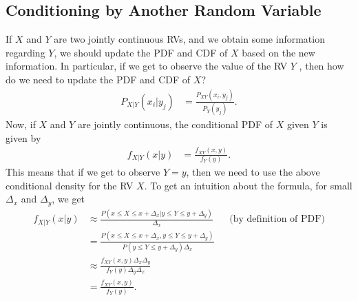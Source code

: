 \subsection{Conditioning by Another Random Variable}

If $X$ and $Y$ are two jointly continuous RVs, and we obtain some information regarding $Y$, we should update the PDF and CDF of $X$ based on the new information. In particular, if we get to observe the value of the RV $Y$ , then how do we need to update the PDF and CDF of $X$?
\begin{align*}
	P_{X|Y}(x_i|y_j)&= \frac{P_{XY}(x_i,y_j)}{P_Y(y_j)}.
\end{align*}
Now, if $X$ and $Y$ are jointly continuous, the conditional PDF of $X$ given $Y$ is given by
\begin{align*}
	f_{X|Y}(x|y)&= \frac{f_{XY}(x,y)}{f_Y(y)}.
\end{align*}
This means that if we get to observe $Y=y$, then we need to use the above conditional density for the RV $X$. To get an intuition about the formula, for small $\Delta_x$ and $\Delta_y$, we get
\begin{align*}
	 f_{X|Y}(x|y) &\approx \frac{P(x \leq X \leq x+\Delta_x | y \leq Y \leq y+\Delta_y)}{\Delta_x} \hspace{20pt} \textrm{(by definition of PDF)}\\
	 &=\frac{P(x \leq X \leq x+\Delta_x , y \leq Y \leq y+\Delta_y)}{P(y \leq Y \leq y+\Delta_y) \Delta_x}\\
	 &\approx \frac{f_{XY}(x,y) \Delta_x \Delta_y}{f_Y(y) \Delta_y \Delta_x}\\
	 &=\frac{f_{XY}(x,y)}{f_Y(y)}.
\end{align*}

